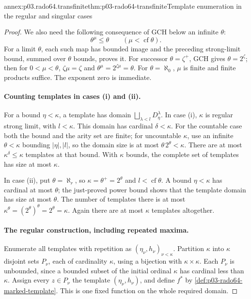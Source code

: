 \begin{annexitem}{annex:p03.rado64.transfinite}{thm:p03-rado64-transfinite}{Template enumeration in the regular and singular cases}
\begin{proof}
We also need the following consequence of GCH below an infinite \(\theta\):
\[
 \theta^\mu\leq\theta\qquad(\mu<\operatorname{cf}\theta).
\]
For a limit \(\theta\), each such map has bounded image and the preceding
strong-limit bound, summed over \(\theta\) bounds, proves it.
For successor \(\theta=\zeta^+\), GCH gives \(\theta=2^\zeta\);
then for \(0<\mu<\theta\), \(\zeta\mu=\zeta\) and
\(\theta^\mu=2^{\zeta\mu}=\theta\).
For \(\theta=\aleph_0\), \(\mu\) is finite and finite products suffice.
The exponent zero is immediate.

\paragraph{Counting templates in cases (i) and (ii).}
For a bound \(\eta<\kappa\), a template has domain
\(\bigsqcup_{\lambda<l}D_\eta^\lambda\).
In case (i), \(\kappa\) is regular strong limit, with \(l<\kappa\).
This domain has cardinal \(\delta<\kappa\).
For the countable case both the bound and the arity set are finite;
for uncountable \(\kappa\), use an infinite
\(\theta<\kappa\) bounding \(|\eta|,|l|\), so the domain size is at most
\(\theta\,2^\theta<\kappa\).
There are at most \(\kappa^\delta\leq\kappa\) templates at that bound.
With \(\kappa\) bounds, the complete set of templates has size at most
\(\kappa\).

In case (ii), put \(\theta=\aleph_r\), so
\(\kappa=\theta^+=2^\theta\) and \(l<\operatorname{cf}\theta\).
A bound \(\eta<\kappa\) has cardinal at most \(\theta\);
the just-proved power bound shows that the template domain has size at most
\(\theta\). The number of templates there is at most
\(\kappa^\theta=(2^\theta)^\theta=2^\theta=\kappa\).
Again there are at most \(\kappa\) templates altogether.

\paragraph{The regular construction, including repeated maxima.}
Enumerate all templates with repetition as
\((\eta_\nu,h_\nu)_{\nu<\kappa}\).
Partition \(\kappa\) into \(\kappa\) disjoint sets \(P_\nu\), each of
cardinality \(\kappa\), using a bijection with \(\kappa\times\kappa\).
Each \(P_\nu\) is unbounded, since a bounded subset of the initial ordinal
\(\kappa\) has cardinal less than \(\kappa\).
Assign every \(z\in P_\nu\) the template \((\eta_\nu,h_\nu)\), and define
\(f^*\) by \cref{def:p03-rado64-marked-template}.
This is one fixed function on the whole required domain.


\end{proof}
\end{annexitem}
